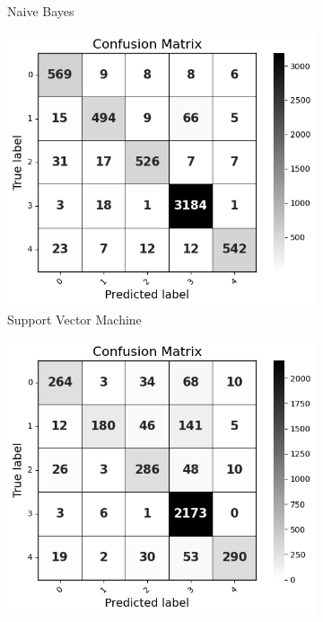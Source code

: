 \begin{figure}[H]
\begin{subfigure}[b]{0.49\textwidth}
        \caption{Naive Bayes}
        \label{NBCM}  %
    \end{subfigure}
    \hfill
    \begin{subfigure}[b]{0.49\textwidth}
        \centering
        \includegraphics[width=\textwidth]{Images/SVM Confusion Matrix.png}
        \caption{Support Vector Machine}
        \label{SVMCM}  %
    \end{subfigure}
    \hfill
    \begin{subfigure}[b]{0.49\textwidth}
        \centering
        \includegraphics[width=\textwidth]{Images/RF Confusion Matrix.png}

\end{subfigure}
\end{figure}
